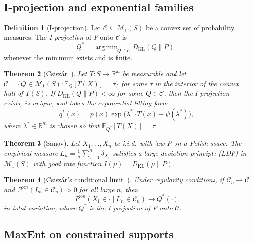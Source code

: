 \documentclass[aps,pre,twocolumn,superscriptaddress,nofootinbib]{revtex4-2}
\newtheorem{theorem}{Theorem}
\theoremstyle{definition}
\newtheorem{definition}[theorem]{Definition}
\theoremstyle{remark}
\newcommand{\R}{\mathbb{R}}
\newcommand{\E}{\mathbb{E}}
\newcommand{\KL}{D_{\mathrm{KL}}}
\DeclareMathOperator*{\argmin}{arg\,min}
\begin{document}
\subsection{I-projection and exponential families}

\begin{definition}[I-projection]
Let $\mathcal{C}\subseteq\mathcal{M}_1(S)$ be a convex set of probability
measures.  The \emph{I-projection} of $P$ onto $\mathcal{C}$ is
\begin{equation}
Q^*=\argmin_{Q\in\mathcal{C}}\KL(Q\|P),
\end{equation}
whenever the minimum exists and is finite.
\end{definition}

\begin{theorem}[Csisz\'{a}r~\cite{Csiszar1975,Csiszar1984}]\label{thm:csiszar}
Let $T\colon S\to\R^m$ be measurable and let $\mathcal{C}=\{Q\in\mathcal{M}_1(S):
\E_Q[T(X)]=\tau\}$ for some $\tau$ in the interior of the convex hull of
$T(S)$. If $\KL(Q\|P)<\infty$ for some $Q\in\mathcal{C}$, then the
I-projection exists, is unique, and takes the exponential-tilting form
\begin{equation}\label{eq:iprojection}
q^*(x)=p(x)\exp\!\big(\lambda^*\cdot T(x)-\psi(\lambda^*)\big),
\end{equation}
where $\lambda^*\in\R^m$ is chosen so that $\E_{Q^*}[T(X)]=\tau$.
\end{theorem}

\begin{theorem}[Sanov]\label{thm:sanov}
Let $X_1,\ldots,X_n$ be i.i.d.\ with law $P$ on a Polish space. The
empirical measure $L_n=\frac{1}{n}\sum_{i=1}^n\delta_{X_i}$ satisfies a
large deviation principle (LDP) in $\mathcal{M}_1(S)$ with good rate function
$I(\mu)=\KL(\mu\|P)$.
\end{theorem}

\begin{theorem}[Csisz\'{a}r's conditional limit~\cite{Csiszar1984}]\label{thm:condlimit}
Under regularity conditions, if $\mathcal{C}_n\to\mathcal{C}$ and
$P^{\otimes n}(L_n\in\mathcal{C}_n)>0$ for all large $n$, then
\begin{equation}
P^{\otimes n}(X_1\in\cdot\mid L_n\in\mathcal{C}_n)\to Q^*(\cdot)
\end{equation}
in total variation, where $Q^*$ is the I-projection of $P$ onto $\mathcal{C}$.
\end{theorem}

\subsection{MaxEnt on constrained supports}
\end{document}
